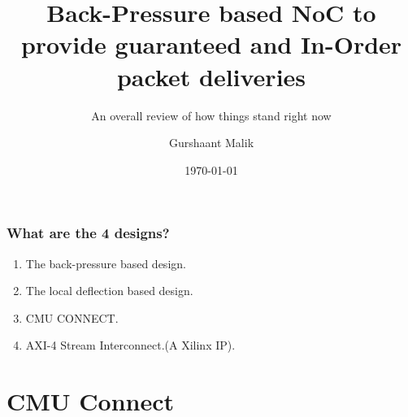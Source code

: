 \documentclass{beamer}
\title{Back-Pressure based NoC to provide guaranteed and In-Order packet deliveries}
\subtitle{An overall review of how things stand right now}
\author{Gurshaant Malik}
\date{\today}
\begin{document}
	\frame{\titlepage}
	\begin{frame}
		\frametitle{What are the 4 designs?}
		\pause
		\begin{enumerate}
			\item The back-pressure based design.
			\pause
			\item The local deflection based design.
			\pause 
			\item CMU CONNECT.
			\pause
			\item AXI-4 Stream Interconnect.\pause(A Xilinx IP).
		\end{enumerate}
	\end{frame}

	\setcounter{showProgressBar}{1}
	\setcounter{showSlideNumbers}{1}
	
	\section{CMU Connect}
	
\end{document}
